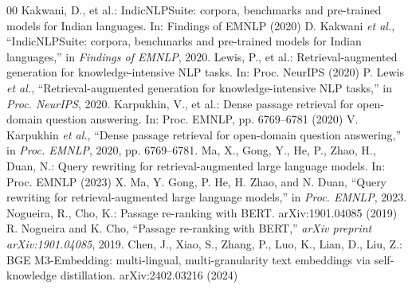 \begingroup
\setlength{\itemsep}{0pt plus 0.2pt}
\begin{thebibliography}{00}
\setlength{\itemsep}{0pt plus 0.2pt}\setlength{\parskip}{0pt}
\ifspringer\else\ifshort\scriptsize\else\ifconf\footnotesize\fi\fi\fi
\ifconf
  \setlength{\itemsep}{0pt}%
  \setlength{\parskip}{0pt}%
  \setlength{\leftmargin}{11pt}%
  \setlength{\labelwidth}{9pt}%
  \setlength{\labelsep}{2pt}%
  \setlength{\itemindent}{0pt}%
\fi
\ifspringer{} Kakwani, D., et al.: IndicNLPSuite: corpora, benchmarks and pre-trained models for Indian languages. In: Findings of EMNLP (2020)
\else{} D. Kakwani \textit{et al.}, ``IndicNLPSuite: corpora, benchmarks and pre-trained models for Indian languages,'' in \textit{Findings of EMNLP}, 2020.\fi
\ifspringer{} Lewis, P., et al.: Retrieval-augmented generation for knowledge-intensive NLP tasks. In: Proc. NeurIPS (2020)
\else{} P. Lewis \textit{et al.}, ``Retrieval-augmented generation for knowledge-intensive NLP tasks,'' in \textit{Proc. NeurIPS}, 2020.\fi
\ifspringer{} Karpukhin, V., et al.: Dense passage retrieval for open-domain question answering. In: Proc. EMNLP, pp. 6769--6781 (2020)
\else{} V. Karpukhin \textit{et al.}, ``Dense passage retrieval for open-domain question answering,'' in \textit{Proc. EMNLP}, 2020, pp. 6769--6781.\fi
\ifspringer{} Ma, X., Gong, Y., He, P., Zhao, H., Duan, N.: Query rewriting for retrieval-augmented large language models. In: Proc. EMNLP (2023)
\else{} X. Ma, Y. Gong, P. He, H. Zhao, and N. Duan, ``Query rewriting for retrieval-augmented large language models,'' in \textit{Proc. EMNLP}, 2023.\fi
\ifspringer{} Nogueira, R., Cho, K.: Passage re-ranking with BERT. arXiv:1901.04085 (2019)
\else{} R. Nogueira and K. Cho, ``Passage re-ranking with BERT,'' \textit{arXiv preprint arXiv:1901.04085}, 2019.\fi
\ifspringer{} Chen, J., Xiao, S., Zhang, P., Luo, K., Lian, D., Liu, Z.: BGE M3-Embedding: multi-lingual, multi-granularity text embeddings via self-knowledge distillation. arXiv:2402.03216 (2024)

\end{thebibliography}
